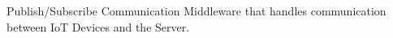 Publish/Subscribe Communication Middleware that handles communication between IoT Devices and the Server.